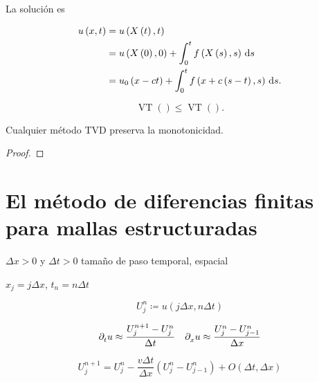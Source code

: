 La solución es

\begin{align*}
	u\left(x,t\right) & =
	u\left(X\left(t\right),t\right)      \\
	                  & =
	u\left(X\left(0\right),0\right)+
	\int_{0}^{t}
	f\left(X\left(s\right),s\right)\dl s \\
	                  & =
	u_{0}\left(x-ct\right)+
	\int_{0}^{t}
	f\left(x+c\left(s-t\right),s\right)\dl s.
\end{align*}

\begin{definition} %
	\begin{equation*}
		\operatorname{VT}\left(\right)\leq
		\operatorname{VT}\left(\right).
	\end{equation*}
\end{definition}

\begin{theorem}
	Cualquier método TVD preserva la monotonicidad.
\end{theorem}

\begin{proof}

\end{proof}

\section*{El método de diferencias finitas para mallas estructuradas}

$\Delta x>0$ y $\Delta t>0$ tamaño de paso temporal, espacial

$x_{j}=j\Delta x$, $t_{n}=n\Delta t$

\begin{equation*}
	U^{n}_{j}\coloneqq
	u\left(j\Delta x, n\Delta t\right)
\end{equation*}

\begin{equation*}
	\difcp{u}{t}\approx
	\dfrac{U^{n+1}_{j}-U^{n}_{j}}{\Delta t}\quad
	\difcp{u}{x}\approx
	\dfrac{U^{n}_{j}-U^{n}_{j-1}}{\Delta x}
\end{equation*}

\begin{example}
	\begin{equation*}
		U^{n+1}_{j}=
		U^{n}_{j}-
		\dfrac{v\Delta t}{\Delta x}
		\left(U^{n}_{j}-U^{n}_{j-1}\right)+
		O\left(\Delta t,\Delta x\right)
	\end{equation*}
\end{example}

